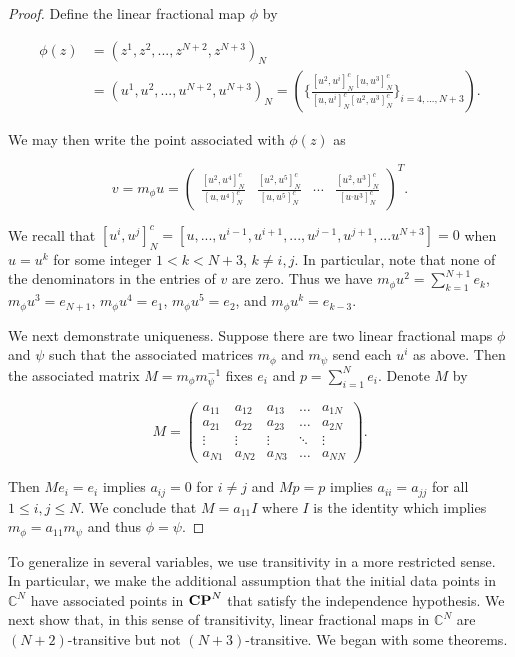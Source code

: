 \documentclass{amsart}
\theoremstyle{theorem}
\theoremstyle{lemma}
\theoremstyle{definition}
\begin{document}
\begin{proof}
Define the linear fractional map $\phi$ by

\begin{align*}\phi(z)&=(z^1, z^2,..., z^{N+2}, z^{N+3})_N \\
&=(u^1, u^2,..., u^{N+2}, u^{N+3})_N=\left( \bigg\{\frac{[u^2, u^i]_N^c[u, u^3]_N^c}{[u, u^i]_N^c[u^2, u^3]_N^c}\bigg\}_{i=4,...,N+3}\right).
\end{align*}


We may then write the point associated with $\phi(z)$ as

$$v=m_{\phi}u=\begin{pmatrix}\frac{[u^2, u^4]_N^c}{[u, u^4]_N^c} & \frac{[u^2, u^5]_N^c}{[u, u^5]_N^c}  & \cdots &  \frac{[u^2, u^3]_N^c}{[u^,u^3]_N^c} \end{pmatrix}^T.$$

We recall that $[u^i, u^j]_N^c=[u,...,u^{i-1},u^{i+1},...,u^{j-1},u^{j+1},...u^{N+3}]=0$ when $u=u^k$ for some integer $1<k<N+3$, $k \neq i,j$. In particular, note that none of the denominators in the entries of $v$ are zero. Thus we have $m_{\phi}u^2=\sum_{k=1}^{N+1}e_k$, $m_{\phi}u^3=e_{N+1}$, $m_{\phi}u^4=e_1$, $m_{\phi}u^5=e_2$, and $m_{\phi}u^k=e_{k-3}$. 

We next demonstrate uniqueness. Suppose there are two linear fractional maps $\phi$ and $\psi$ such that the associated matrices $m_{\phi}$ and $m_{\psi}$ send each $u^i$ as above. Then the associated matrix $M=m_{\phi}m_{\psi}^{-1}$ fixes $e_i$ and $p=\sum_{i=1}^Ne_i$. Denote $M$ by

$$ M=\begin{pmatrix}
    a_{11} & a_{12} & a_{13} & \dots  & a_{1N} \\
    a_{21} & a_{22} & a_{23} & \dots  & a_{2N} \\
    \vdots & \vdots & \vdots & \ddots & \vdots \\
    a_{N1} & a_{N2} & a_{N3} & \dots  & a_{NN}
\end{pmatrix}.
$$

Then $Me_i=e_i$ implies $a_{ij}=0$ for $i \neq j$ and $Mp=p$ implies $a_{ii}=a_{jj}$ for all $1 \leq i,j \leq N$. We conclude that $M=a_{11}I$ where $I$ is the identity which implies $m_{\phi}=a_{11}m_{\psi}$ and thus $\phi=\psi$.
\end{proof}


To generalize in several variables, we use transitivity in a more restricted sense. In particular, we make the additional assumption that the initial data points in $\mathbb{C}^N$ have associated points in ${\bf CP}^N$ that satisfy the independence hypothesis. We next show that, in this sense of transitivity, linear fractional maps in $\mathbb{C}^N$ are $(N+2)$-transitive but not $(N+3)$-transitive. We began with some theorems.
\end{document}
